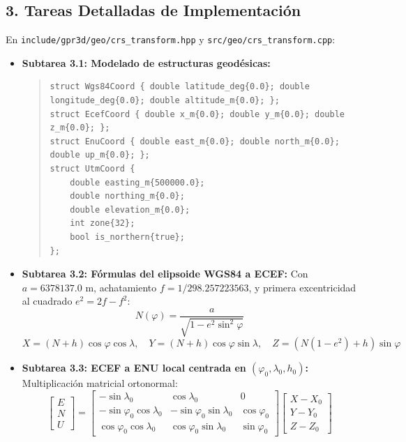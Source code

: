 \documentclass[11pt,a4paper]{article}
\begin{document}
\subsection{3. Tareas Detalladas de Implementación}
En \texttt{include/gpr3d/geo/crs\_transform.hpp} y \texttt{src/geo/crs\_transform.cpp}:
\begin{itemize}
    \item \textbf{Subtarea 3.1: Modelado de estructuras geodésicas:}
\begin{quote}
\small
\begin{verbatim}
struct Wgs84Coord { double latitude_deg{0.0}; double longitude_deg{0.0}; double altitude_m{0.0}; };
struct EcefCoord { double x_m{0.0}; double y_m{0.0}; double z_m{0.0}; };
struct EnuCoord { double east_m{0.0}; double north_m{0.0}; double up_m{0.0}; };
struct UtmCoord {
    double easting_m{500000.0};
    double northing_m{0.0};
    double elevation_m{0.0};
    int zone{32};
    bool is_northern{true};
};
\end{verbatim}
\end{quote}

    \item \textbf{Subtarea 3.2: Fórmulas del elipsoide WGS84 a ECEF:}
    Con $a = 6378137.0\text{ m}$, achatamiento $f = 1/298.257223563$, y primera excentricidad al cuadrado $e^2 = 2f - f^2$:
    \begin{equation}
        N(\varphi) = \frac{a}{\sqrt{1 - e^2 \sin^2\varphi}}
    \end{equation}
    \begin{equation}
        X = (N + h)\cos\varphi\cos\lambda, \quad Y = (N + h)\cos\varphi\sin\lambda, \quad Z = (N(1 - e^2) + h)\sin\varphi
    \end{equation}

    \item \textbf{Subtarea 3.3: ECEF a ENU local centrada en $(\varphi_0, \lambda_0, h_0)$:}
    Multiplicación matricial ortonormal:
    \begin{equation}
        \begin{bmatrix} E \\ N \\ U \end{bmatrix} =
        \begin{bmatrix}
        -\sin\lambda_0 & \cos\lambda_0 & 0 \\
        -\sin\varphi_0\cos\lambda_0 & -\sin\varphi_0\sin\lambda_0 & \cos\varphi_0 \\
        \cos\varphi_0\cos\lambda_0 & \cos\varphi_0\sin\lambda_0 & \sin\varphi_0
        \end{bmatrix}
        \begin{bmatrix} X - X_0 \\ Y - Y_0 \\ Z - Z_0 \end{bmatrix}
    \end{equation}


\end{itemize}
\end{document}
